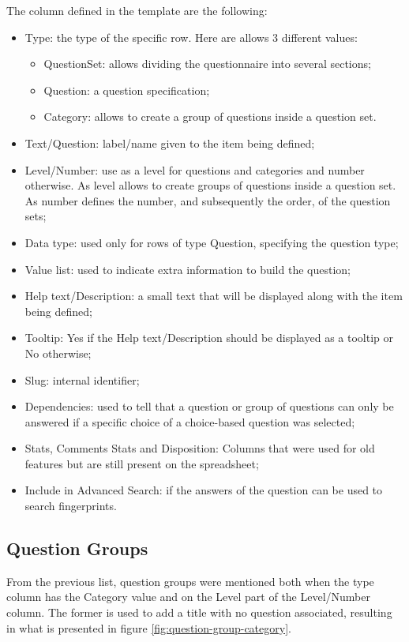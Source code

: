 The column defined in the template are the following:
\begin{itemize}
    \item Type: the type of the specific row. Here are allows 3 different values:
        \begin{itemize}
            \item QuestionSet: allows dividing the questionnaire into several sections;
            \item Question: a question specification;
            \item Category: allows to create a group of questions inside a question set.
        \end{itemize}
    \item Text/Question: label/name given to the item being defined;
    \item Level/Number: use as a level for questions and categories and number otherwise. As level allows to create groups of questions inside a question set. As number defines the number, and subsequently the order, of the question sets;
    \item Data type: used only for rows of type Question, specifying the question type;
    \item Value list: used to indicate extra information to build the question;
    \item Help text/Description: a small text that will be displayed along with the item being defined;
    \item Tooltip: Yes if the Help text/Description should be displayed as a tooltip or No otherwise;
    \item Slug: internal identifier;
    \item Dependencies: used to tell that a question or group of questions can only be answered if a specific choice of a choice-based question was selected;
    \item Stats, Comments Stats and Disposition: Columns that were used for old features but are still present on the spreadsheet;
    \item Include in Advanced Search: if the answers of the question can be used to search fingerprints.
\end{itemize}

\subsection*{Question Groups}
From the previous list, question groups were mentioned both when the type column has the Category value and on the Level part of the Level/Number column.
The former is used to add a title with no question associated, resulting in what is presented in figure \ref{fig:question-group-category}.

